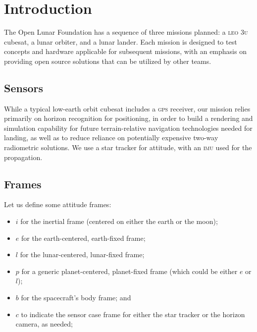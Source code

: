 \documentclass[12pt]{article}
\begin{document}
\maketitle

\section{Introduction}
The Open Lunar Foundation has a sequence of three missions planned: a \textsc{leo} \textsc{3u} cubesat, a lunar orbiter, and a lunar lander. Each mission is designed to test concepts and hardware applicable for subsequent missions, with an emphasis on providing open source solutions that can be utilized by other teams.

\subsection{Sensors}
While a typical low-earth orbit cubesat includes a \textsc{gps} receiver, our mission relies primarily on horizon recognition \citep{Christian2017} for positioning, in order to build a rendering and simulation capability for future terrain-relative navigation technologies needed for landing, as well as to reduce reliance on potentially expensive two-way radiometric solutions. We use a star tracker for attitude, with an \textsc{imu} used for the propagation.

\subsection{Frames}
Let us define some attitude frames:
\begin{itemize}
\item $i$ for the inertial frame (centered on either the earth or the moon);
\item $e$ for the earth-centered, earth-fixed frame;
\item $l$ for the lunar-centered, lunar-fixed frame;
\item $p$ for a generic planet-centered, planet-fixed frame (which could be either $e$ or $l$);
\item $b$ for the spacecraft's body frame; and
\item $c$ to indicate the sensor case frame for either the star tracker or the horizon camera, as needed;
\end{itemize}
\end{document}

